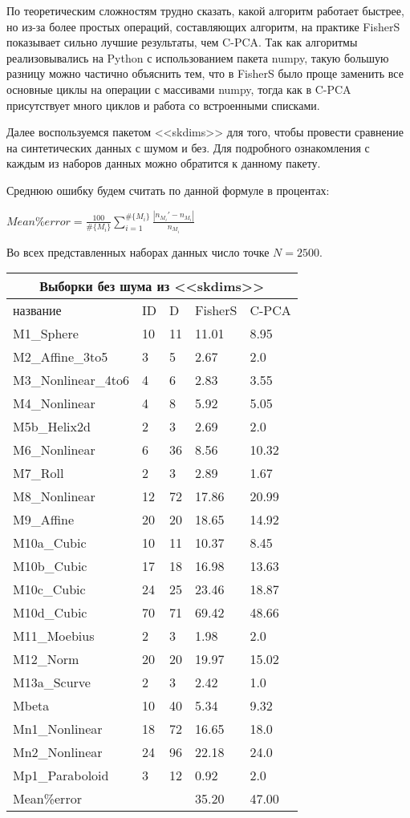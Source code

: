 \documentclass[english, russian]{sobraep}
\begin{document}
По теоретическим сложностям трудно сказать, какой алгоритм работает быстрее, но из-за более простых операций, составляющих алгоритм, на практике FisherS показывает сильно лучшие результаты, чем C-PCA. Так как алгоритмы реализовывались на Python с использованием пакета numpy, такую большую разницу можно частично объяснить тем, что в FisherS было проще заменить все основные циклы на операции с массивами numpy, тогда как в C-PCA присутствует много циклов и работа со встроенными списками.

Далее воспользуемся пакетом <<skdims>> для того, чтобы провести сравнение на синтетических данных с шумом и без. Для подробного ознакомления с каждым из наборов данных можно обратится к данному пакету. 

Среднюю ошибку будем считать по данной формуле в процентах: 

\begin{center}
    $Mean\%error = \frac{100}{\#\{M_i\}}\sum_{i=1}^{\#\{M_i\}}\frac{|n_M_i' - n_M_i|}{n_M_i}$
\end{center}
Во всех представленных наборах данных число точке $N = 2500$.
    

\begin{tabular}{
p{2.4cm}|p{0.9cm}|p{0.9cm}|p{0.9cm}|p{0.9cm}  }
 \hline
 \multicolumn{5}{c}{Выборки без шума из <<skdims>>} \\
 \hline
 название & ID & D & FisherS& C-PCA\\
 \hline
 M1_Sphere & 10 & 11 & 11.01 & 8.95\\
M2_Affine_3to5 & 3 & 5 & 2.67 & 2.0\\
M3_Nonlinear_4to6   & 4 & 6 & 2.83 & 3.55\\
M4_Nonlinear   & 4 & 8 & 5.92 & 5.05\\
M5b_Helix2d   & 2 & 3 & 2.69 & 2.0\\
M6_Nonlinear   & 6 & 36 & 8.56 & 10.32\\
M7_Roll   & 2 & 3 & 2.89 & 1.67\\
M8_Nonlinear   & 12 & 72 & 17.86 & 20.99\\
M9_Affine   & 20 & 20 & 18.65 & 14.92\\
M10a_Cubic   & 10 & 11 & 10.37 & 8.45\\
M10b_Cubic   & 17 & 18 & 16.98 & 13.63\\
M10c_Cubic   & 24 & 25 & 23.46 & 18.87\\
M10d_Cubic   & 70 & 71 & 69.42 & 48.66\\
M11_Moebius   & 2 & 3 & 1.98 & 2.0\\
M12_Norm   & 20 & 20 & 19.97 & 15.02\\
M13a_Scurve   & 2 & 3 & 2.42 & 1.0\\
Mbeta   & 10 & 40 & 5.34 & 9.32\\
Mn1_Nonlinear   & 18 & 72 & 16.65 & 18.0\\
Mn2_Nonlinear   & 24 & 96 & 22.18 & 24.0\\
Mp1_Paraboloid   & 3 & 12 & 0.92 & 2.0\\
\hline
Mean\%error & & & 35.20 & 47.00\\
 \hline

\end{tabular}
\end{document}
